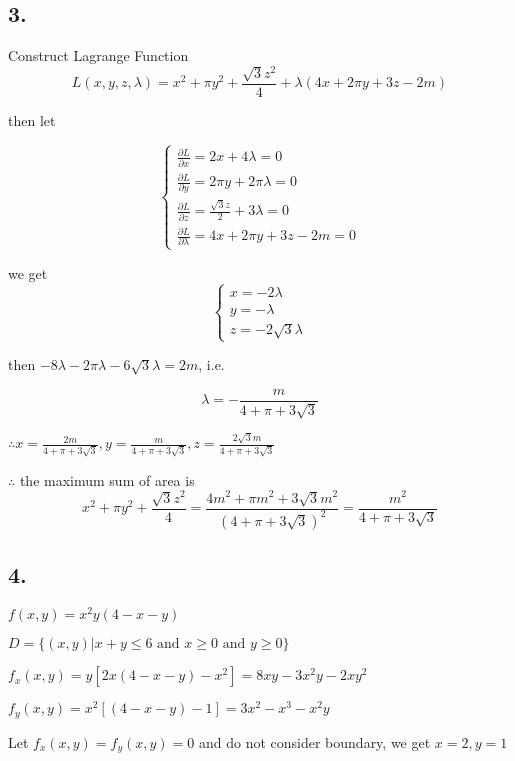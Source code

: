 \documentclass{article}
\begin{document}
  \subsection*{3. }

  Construct Lagrange Function $$L(x, y, z, \lambda) = x^2 + \pi y^2 + \frac{\sqrt 3z^2}{4} + \lambda (4x + 2\pi y + 3z - 2m)$$

  then let

  $$\left\{ \begin{array}{ll} 
    \frac{\partial L}{\partial x} = 2x + 4\lambda = 0 \\
    \frac{\partial L}{\partial y} = 2\pi y + 2\pi\lambda = 0 \\
    \frac{\partial L}{\partial z} = \frac{\sqrt 3 z}{2} + 3\lambda = 0 \\
    \frac{\partial L}{\partial \lambda} = 4x + 2\pi y + 3z - 2m = 0
  \end{array}\right.$$

  we get $$\left\{\begin{array}{ll}  x = -2\lambda \\ y = -\lambda \\ z = -2 \sqrt 3 \lambda\end{array}\right.$$

  then $-8\lambda - 2\pi \lambda - 6\sqrt 3 \lambda = 2m$, i.e.

  $$\lambda = -\frac{m}{4 + \pi + 3\sqrt 3}$$

  $\therefore x = \frac{2m}{4 + \pi + 3\sqrt 3}, y = \frac{m}{4 + \pi + 3\sqrt 3}, z = \frac{2\sqrt 3 m}{4 + \pi + 3\sqrt 3}$

  $\therefore$ the maximum sum of area is $$x^2 + \pi y^2 + \frac{\sqrt 3 z^2}{4} = \frac{4m^2 + \pi m^2 + 3\sqrt 3m^2}{(4 + \pi + 3\sqrt 3)^2} = \frac{m^2}{4+\pi+3\sqrt 3}$$

  \subsection*{4. }

  $f(x, y) = x^2y(4-x-y)$

  $D = \{ (x, y) | x + y \leq 6 \textrm{ and } x \geq 0 \textrm{ and } y \geq 0 \}$

  $f_x(x, y) = y[2x(4-x-y) - x^2] = 8xy - 3x^2y -2xy^2$

  $f_y(x, y) = x^2[(4-x-y) -1] = 3x^2-x^3-x^2y$

  Let $f_x(x, y) = f_y(x, y) = 0$ and do not consider boundary, we get $x = 2, y = 1$
\end{document}
